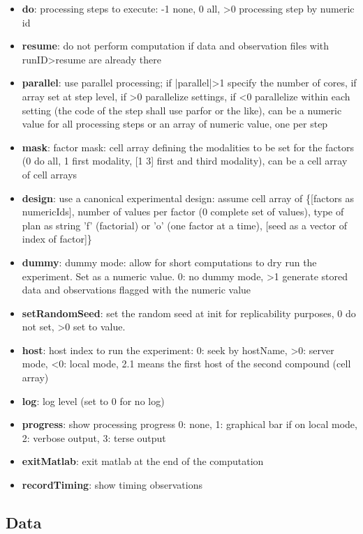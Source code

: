 \documentclass[a4paper,fleqn]{tufte-handout}
\begin{document}
\begin{itemize}
\item \textbf{do}: processing steps to execute: -1 none, 0 all, >0 processing step by numeric id
\item \textbf{resume}: do not perform computation if data and observation files with runID>resume are already there
\item \textbf{parallel}: use parallel processing; if |parallel|>1 specify the number of cores, if array set at step level, if >0 parallelize settings, if <0 parallelize within each setting (the code of the step shall use parfor or the like), can be a numeric value for all processing steps or an array of numeric value, one per step
\item \textbf{mask}: factor mask: cell array defining the modalities to be set for the factors (0 do all, 1 first modality, [1 3] first and third modality), can be a cell array of cell arrays
\item \textbf{design}: use a canonical experimental design: assume cell array of \{[factors as numericIds], number of values per factor (0 complete set of values), type of plan as string 'f' (factorial) or 'o' (one factor at a time), [seed as a vector of index of factor]\}
\item \textbf{dummy}:  dummy mode: allow for short computations to dry run the experiment. Set as a numeric value. 0: no dummy mode, >1 generate stored data and observations flagged with the numeric value
\item \textbf{setRandomSeed}: set the random seed at init for replicability purposes, 0 do not set, >0 set to value.
\item \textbf{host}: host index to run the experiment: 0: seek by hostName, >0: server mode, <0: local mode, 2.1 means the first host of the second compound (cell array)
\item \textbf{log}: log level (set to 0 for no log)
\item \textbf{progress}: show processing progress 0: none, 1: graphical bar if on local mode, 2: verbose output, 3: terse output
\item \textbf{exitMatlab}: exit matlab at the end of the computation
\item \textbf{recordTiming}: show timing observations
\end{itemize}

\subsection{Data}
\end{document}
